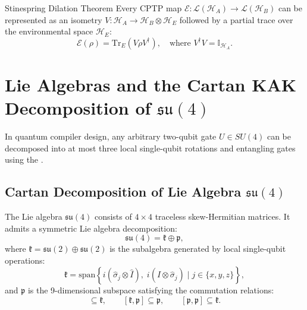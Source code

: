 \begin{theorembox}{Stinespring Dilation Theorem}
Every CPTP map $\mathcal{E}: \mathcal{L}(\mathcal{H}_A) \to \mathcal{L}(\mathcal{H}_B)$ can be represented as an isometry $V: \mathcal{H}_A \to \mathcal{H}_B \otimes \mathcal{H}_E$ followed by a partial trace over the environmental space $\mathcal{H}_E$:
\begin{equation}
    \mathcal{E}(\rho) = \text{Tr}_E \left( V \rho V^\dagger \right), \quad \text{where } V^\dagger V = \mathbb{I}_{\mathcal{H}_A}.
\end{equation}
\end{theorembox}

\section{Lie Algebras and the Cartan KAK Decomposition of $\mathfrak{su}(4)$}
\label{sec:app_cartan_kak}

In quantum compiler design, any arbitrary two-qubit gate $U \in SU(4)$ can be decomposed into at most three local single-qubit rotations and entangling gates using the .

\subsection{Cartan Decomposition of Lie Algebra $\mathfrak{su}(4)$}
The Lie algebra $\mathfrak{su}(4)$ consists of $4 \times 4$ traceless skew-Hermitian matrices. It admits a symmetric Lie algebra decomposition:
\begin{equation}
    \mathfrak{su}(4) = \mathfrak{k} \oplus \mathfrak{p},
    \label{eq:cartan_decomp_split}
\end{equation}
where $\mathfrak{k} = \mathfrak{su}(2) \oplus \mathfrak{su}(2)$ is the subalgebra generated by local single-qubit operations:
\begin{equation}
    \mathfrak{k} = \text{span}\left\{ i (\hat{\sigma}_j \otimes \hat{I}), \; i (\hat{I} \otimes \hat{\sigma}_j) \mid j \in \{x, y, z\} \right\},
\end{equation}
and $\mathfrak{p}$ is the 9-dimensional subspace satisfying the commutation relations:
\begin{equation}
    [\mathfrak{k}, \mathfrak{k}] \subseteq \mathfrak{k}, \qquad [\mathfrak{k}, \mathfrak{p}] \subseteq \mathfrak{p}, \qquad [\mathfrak{p}, \mathfrak{p}] \subseteq \mathfrak{k}.
\end{equation}

